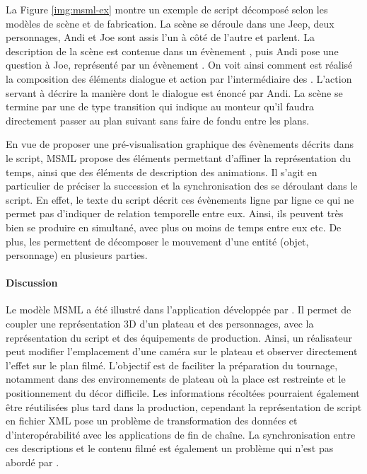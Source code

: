 La Figure \ref{img:msml-ex} montre un exemple de script décomposé selon les modèles de scène et de fabrication. 
La scène se déroule dans une Jeep, deux personnages, Andi et Joe sont assis l'un à côté de l'autre et parlent. 
La description de la scène est contenue dans un évènement , puis Andi pose une question à Joe, représenté par un évènement . 
On voit ainsi comment est réalisé la composition des éléments dialogue et action par l'intermédiaire des .
L'action servant à décrire la manière dont le dialogue est énoncé par Andi.
La scène se termine par une  de type transition qui indique au monteur qu'il faudra directement passer au plan suivant sans faire de fondu entre les plans.



En vue de proposer une pré-visualisation graphique des évènements décrits dans le script, MSML propose des éléments permettant d'affiner la représentation du temps, ainsi que des éléments de description des animations.
Il s'agit en particulier de préciser la succession et la synchronisation des  se déroulant dans le script. 
En effet, le texte du script décrit ces évènements ligne par ligne ce qui ne permet pas d'indiquer de relation temporelle entre eux.
Ainsi, ils peuvent très bien se produire en simultané, avec plus ou moins de temps entre eux etc.
De plus, les  permettent de décomposer le mouvement d'une entité (objet, personnage) en plusieurs parties.

\paragraph{Discussion}
Le modèle MSML a été illustré dans l'application  développée par \cite{Cardinaels2008}. 
Il permet de coupler une représentation 3D d'un plateau et des personnages, avec la représentation du script et des équipements de production.
Ainsi, un réalisateur peut modifier l'emplacement d'une caméra sur le plateau et observer directement l'effet sur le plan filmé. 
L'objectif est de faciliter la préparation du tournage, notamment dans des environnements de plateau où la place est restreinte et le positionnement du décor difficile.
Les informations récoltées pourraient également être réutilisées plus tard dans la production, cependant la représentation de script en fichier XML pose un problème de transformation des données et d'interopérabilité avec les applications de fin de chaîne.
La synchronisation entre ces descriptions et le contenu filmé est également un problème qui n'est pas abordé par \cite{VanRijsselbergen2009}. 


